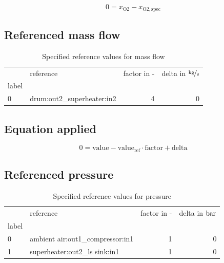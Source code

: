 \documentclass[]{article}
\begin{document}
\begin{equation}
\label{eq:Connection_O2}
0 = x_\mathrm{O2} - x_\mathrm{O2,spec}
\end{equation}

\subsection{Referenced mass flow}

\begin{table}[H]
\centering
\caption{Specified reference values for mass flow}
\begin{tabular}{llrr}
\toprule
{} &                   reference &  factor in - &  delta in $\unitfrac[]{kg}{s}$ \\
label &                             &              &                                \\
\midrule
0     &  drum:out2\_superheater:in2 &            4 &                              0 \\
\bottomrule
\end{tabular}
\end{table}
\subsection{Equation applied}

\begin{equation}
\label{eq:Connection_ref}
0 = \text{value} - \text{value}_\mathrm{ref} \cdot \mathrm{factor} + \text{delta}
\end{equation}

\subsection{Referenced pressure}

\begin{table}[H]
\centering
\caption{Specified reference values for pressure}
\begin{tabular}{llrr}
\toprule
{} &                         reference &  factor in - &  delta in $\unit[]{bar}$ \\
label &                                   &              &                          \\
\midrule
0     &  ambient air:out1\_compressor:in1 &            1 &                        0 \\
1     &     superheater:out2\_ls sink:in1 &            1 &                        0 \\
\bottomrule
\end{tabular}
\end{table}
\end{document}
